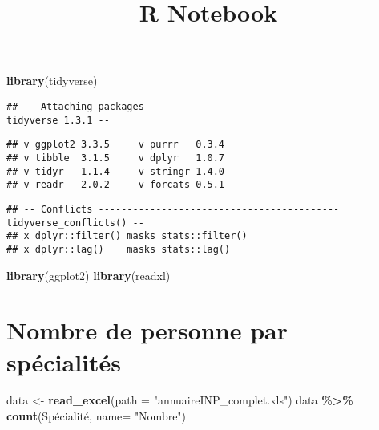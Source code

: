 \documentclass[
]{article}
\title{R Notebook}
\author{}
\date{\vspace{-2.5em}}
\newenvironment{Shaded}{\begin{snugshade}}{\end{snugshade}}
\newcommand{\DataTypeTok}[1]{\textcolor[rgb]{0.13,0.29,0.53}{#1}}
\newcommand{\KeywordTok}[1]{\textcolor[rgb]{0.13,0.29,0.53}{\textbf{#1}}}
\newcommand{\NormalTok}[1]{#1}
\newcommand{\OperatorTok}[1]{\textcolor[rgb]{0.81,0.36,0.00}{\textbf{#1}}}
\newcommand{\StringTok}[1]{\textcolor[rgb]{0.31,0.60,0.02}{#1}}
\begin{document}
\maketitle

\begin{Shaded}
\begin{Highlighting}[]
\KeywordTok{library}\NormalTok{(tidyverse)}
\end{Highlighting}
\end{Shaded}

\begin{verbatim}
## -- Attaching packages --------------------------------------- tidyverse 1.3.1 --
\end{verbatim}

\begin{verbatim}
## v ggplot2 3.3.5     v purrr   0.3.4
## v tibble  3.1.5     v dplyr   1.0.7
## v tidyr   1.1.4     v stringr 1.4.0
## v readr   2.0.2     v forcats 0.5.1
\end{verbatim}

\begin{verbatim}
## -- Conflicts ------------------------------------------ tidyverse_conflicts() --
## x dplyr::filter() masks stats::filter()
## x dplyr::lag()    masks stats::lag()
\end{verbatim}

\begin{Shaded}
\begin{Highlighting}[]
\KeywordTok{library}\NormalTok{(ggplot2)}
\KeywordTok{library}\NormalTok{(readxl)}
\end{Highlighting}
\end{Shaded}

\hypertarget{nombre-de-personne-par-spuxe9cialituxe9s}{%
\section{Nombre de personne par
spécialités}\label{nombre-de-personne-par-spuxe9cialituxe9s}}

\begin{Shaded}
\begin{Highlighting}[]
\NormalTok{data \textless{}{-}}\StringTok{ }\KeywordTok{read\_excel}\NormalTok{(}\DataTypeTok{path =} \StringTok{"annuaireINP\_complet.xls"}\NormalTok{)}
\NormalTok{data }\OperatorTok{\%\textgreater{}\%}
\StringTok{  }\KeywordTok{count}\NormalTok{(Spécialité, }\DataTypeTok{name=} \StringTok{"Nombre"}\NormalTok{)}
\end{Highlighting}
\end{Shaded}
\end{document}
